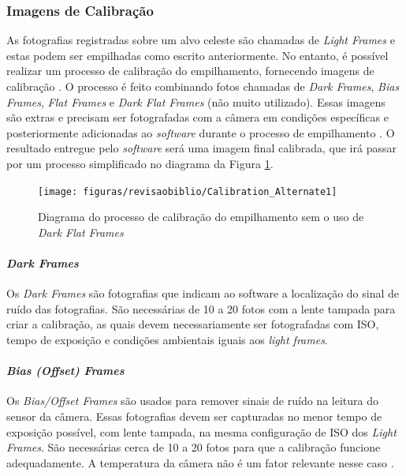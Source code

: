 \subsubsection{Imagens de Calibração}

As fotografias registradas sobre um alvo celeste são chamadas de \textit{Light Frames} e estas podem ser empilhadas como escrito anteriormente. No entanto, é possível realizar um processo de calibração do empilhamento, fornecendo imagens de calibração \cite{man:deepskystackerfaq}.
O processo é feito combinando fotos chamadas de \textit{Dark Frames},\textit{ Bias Frames}, \textit{Flat Frames} e \textit{Dark Flat Frames} (não muito utilizado). Essas imagens são extras e precisam ser fotografadas com a câmera em condições específicas e posteriormente adicionadas ao \textit{software} durante o processo de empilhamento 
\cite{man:deepskystackerBetterImages}. O resultado entregue pelo \textit{software} será uma imagem final calibrada, que irá passar por um processo simplificado no diagrama da Figura \ref{fig:calibrationDeepSkyStacker}.


\begin{figure}[!htb]
	\centering
	\caption{Diagrama do processo de calibração do empilhamento sem o uso de \textit{Dark Flat Frames}}
	\texttt{[image: figuras/revisaobiblio/Calibration\_Alternate1]}
	\label{fig:calibrationDeepSkyStacker}
\end{figure}


\paragraph{\textit{Dark Frames}}

Os \textit{Dark Frames} são fotografias que indicam ao software a localização do sinal de ruído das fotografias. São necessárias de 10 a 20 fotos com a lente tampada para criar a calibração, as quais devem necessariamente ser fotografadas com ISO, tempo de exposição e condições ambientais iguais aos \textit{light frames}.\cite{man:deepskystackerfaq}

\paragraph{\textit{Bias (Offset) Frames}}

Os \textit{Bias/Offset Frames} são usados para remover sinais de ruído na leitura do sensor da câmera. Essas fotografias devem ser capturadas no menor tempo de exposição possível, com lente tampada, na mesma configuração de ISO dos \textit{Light Frames}. São necessárias cerca de 10 a 20 fotos para que a calibração funcione adequadamente. A temperatura da câmera não é um fator relevante nesse caso \cite{man:deepskystackerfaq}.


